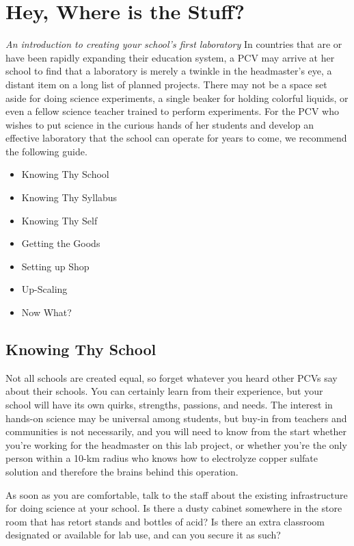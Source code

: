 \chapter{Hey, Where is the Stuff?}
\textit{An introduction to creating your school’s first laboratory}
In countries that are or have been rapidly expanding their education system, a PCV may arrive at her school to find that a laboratory is merely a twinkle in the headmaster’s eye, a distant item on a long list of planned projects.  There may not be a space set aside for doing science experiments, a single beaker for holding colorful liquids, or even a fellow science teacher trained to perform experiments.  For the PCV who wishes to put science in the curious hands of her students and develop an effective laboratory that the school can operate for years to come, we recommend the following guide.
\begin{itemize}
\item{Knowing Thy School}
\item{Knowing Thy Syllabus}
\item{Knowing Thy Self}
\item{Getting the Goods}
\item{Setting up Shop}
\item{Up-Scaling}
\item{Now What?}
\end{itemize}

\section{Knowing Thy School}
Not all schools are created equal, so forget whatever you heard other PCVs say about their schools.  You can certainly learn from their experience, but your school will have its own quirks, strengths, passions, and needs.  The interest in hands-on science may be universal among students, but buy-in from teachers and communities is not necessarily, and you will need to know from the start whether you’re working for the headmaster on this lab project, or whether you’re the only person within a 10-km radius who knows how to electrolyze copper sulfate solution and therefore the brains behind this operation.

As soon as you are comfortable, talk to the staff about the existing infrastructure for doing science at your school.  Is there a dusty cabinet somewhere in the store room that has retort stands and bottles of acid?  Is there an extra classroom designated or available for lab use, and can you secure it as such?  

